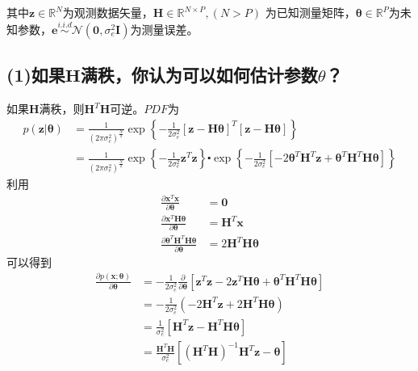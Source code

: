 \documentclass[fontset=windows]{article}
\numberwithin{figure}{section}
\begin{document}
其中\(\mathbf{z}\in \mathbb{R} ^N\)为观测数据矢量，\(\mathbf{H}\in \mathbb{R}^{N\times P},(N>P)\)
为已知测量矩阵，\(\boldsymbol{\theta}\in \mathbb{R} ^P\)为未知参数，\(\mathbf{e}\overset{i.i.d}{\sim}
\mathcal{N}(\mathbf{0},\sigma^2_e \mathbf{I})\)为测量误差。
\subsection*{(1)如果\(\mathbf{H}\)满秩，你认为可以如何估计参数\(\theta\)？}

如果\(\mathbf{H}\)满秩，则\(\mathbf{H}^T \mathbf{H}\)可逆。\(PDF\)为
\begin{align*}
	p(\mathbf{z}|\boldsymbol{\theta})
	 & =\frac{1}{(2\pi \sigma_e^2)^{\frac{N}{2}}}
	\exp\left\{-\frac{1}{2\sigma_e^2} \left[\mathbf{z-H}\boldsymbol{\theta}\right]^T
	\left[\mathbf{z-H}\boldsymbol{\theta}\right]\right\} \\
	 & =\frac{1}{(2\pi \sigma_e^2)^{\frac{N}{2}}}
	\exp\left\{-\frac{1}{2\sigma_e^2} \mathbf{z}^T \mathbf{z}\right\}\centerdot
	\exp\left\{-\frac{1}{2\sigma_e^2} \left[-2\boldsymbol{\theta}^T\mathbf{H}^T\mathbf{z}
		+\boldsymbol{\theta}^T\mathbf{H}^T\mathbf{H}\boldsymbol{\theta}\right]\right\}
\end{align*}
利用
\begin{align*}
	\frac{\partial \mathbf{x}^T \mathbf{x}}{\partial \mathbf{\boldsymbol{\theta}}}
	 & =\mathbf{0}                                  \\
	\frac{\partial \mathbf{x}^T \mathbf{H}\boldsymbol{\theta}}{\partial \boldsymbol{\theta}}
	 & =\mathbf{H}^T \mathbf{x}                     \\
	\frac{\partial \boldsymbol{\theta}^T \mathbf{H}^T\mathbf{H}\boldsymbol{\theta}}{\partial \boldsymbol{\theta}}
	 & =2\mathbf{H}^T \mathbf{H}\boldsymbol{\theta}
\end{align*}
可以得到
\begin{align*}
	\frac{\partial p(\mathbf{x};\boldsymbol{\theta})}{\partial \boldsymbol{\theta}}
	 & =- \frac{1}{2\sigma_e^2} \frac{\partial}{\partial \boldsymbol{\theta}}
	[\mathbf{z}^T \mathbf{z}- 2\mathbf{z}^T \mathbf{H} \boldsymbol{\theta}
	+\boldsymbol{\theta}^T \mathbf{H}^T \mathbf{H} \boldsymbol{\theta}]                                                    \\
	 & =- \frac{1}{2\sigma_e^2}(-2\mathbf{H}^T \mathbf{z}+2\mathbf{H}^T \mathbf{H} \boldsymbol{\theta})                    \\
	 & =\frac{1}{\sigma_e^2}[\mathbf{H}^T \mathbf{z}-\mathbf{H}^T \mathbf{H}\boldsymbol{\theta}]                           \\
	 & =\frac{\mathbf{H}^T\mathbf{H}}{\sigma_e^2}[(\mathbf{H}^T\mathbf{H})^{-1}\mathbf{H}^T\mathbf{z}-\boldsymbol{\theta}]
\end{align*}
\end{document}
